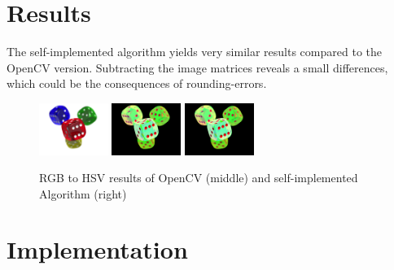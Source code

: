 \section{Results}

The self-implemented algorithm yields very similar results compared to the OpenCV version. Subtracting the image matrices reveals a small differences, which could be the consequences of rounding-errors.

\begin{figure}[H]
    \centering

    \includegraphics[width=0.20\textwidth]{images/dice.png}
    \includegraphics[width=0.20\textwidth]{images/cv-hsv.png}
    \includegraphics[width=0.20\textwidth]{images/own-hsv.png}
    
    \caption{RGB to HSV results of OpenCV (middle) and self-implemented  Algorithm (right)}
    \label{fig:hsv}
\end{figure}

\section{Implementation}

